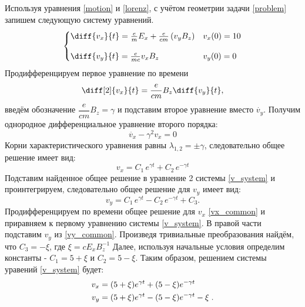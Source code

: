 \documentclass[a4paper]{article}
\begin{document}
Используя уравнения \eqref{motion} и \eqref{lorenz}, с учётом геометрии задачи \ref{problem} запишем следующую систему уравнений.
\begin{equation}\label{v_system}
\begin{cases}
\diff{v_x}{t} = \frac{e}{m}E_x + \frac{e}{cm}\left(v_yB_z\right)	& 	v_x(0) = 10 \\[10pt]
\diff{v_y}{t} = \frac{e}{mc} v_x B_z					&	v_y(0) = 0 \\
\end{cases}
\end{equation}
Продифференцируем первое уравнение по времени
\[
\diff[2]{v_x}{t} =\frac{e}{cm} B_z \diff{v_y}{t},
\]
введём обозначение $\dfrac{e}{cm}B_z = \gamma$ и подставим второе уравнение вместо $\dot{v_y}$. Получим однородное дифференциальное уравнение второго порядка:
\[
\ddot{v_x} - \gamma^2 v_x = 0		
\]
Корни характеристического уравнения равны $\lambda_{1,2} = \pm \gamma$, следовательно общее решение имеет вид:
\begin{equation}\label{vx_common}
v_x = C_1\, e^{\gamma t} + C_2\, e^{-\gamma t}
\end{equation}
Подставим найденное общее решение в уравнение 2 системы \eqref{v_system} и проинтегрируем, следовательно общее решение для $v_y$ имеет вид:
\begin{equation}\label{vy_common}
v_y = C_1 \, e^{\gamma t} - C_2 \, e^{-\gamma t} + C_3 .
\end{equation}
Продифференцируем по времени общее решение для $v_x$ \eqref{vx_common} и приравняем к первому уравнению системы \eqref{v_system}. В правой части подставим $v_y$ из \eqref{vy_common}. Произведя тривиальные преобразования найдём, что $C_3 = -\xi$, где $\xi = cE_xB_z^{-1}$ Далее, используя начальные условия определим константы - $C_1 = 5 + \xi$ и $C_2 = 5 - \xi$. Таким образом, решением системы уравений \eqref{v_system} будет:
\begin{align}\label{analytic}
v_x &= (5 + \xi)e^{\gamma t} + (5 - \xi)e^{-\gamma t} \\
v_y &= (5 + \xi)e^{\gamma t} - (5 - \xi)e^{-\gamma t} -\xi \hspace{0.1 cm} .
\end{align}

\newpage
\end{document}
